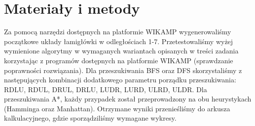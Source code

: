 \documentclass{classrep}
\begin{document}
\section{Materiały i metody}
Za pomocą narzędzi dostępnych na platformie WIKAMP wygenerowaliśmy początkowe układy łamigłówki w odległościach 1-7. Przetestowaliśmy wyżej wymienione algorytmy w wymaganych wariantach opisanych w treści zadania korzystając z programów dostępnych na platformie WIKAMP (sprawdzanie poprawności rozwiązania). Dla przeszukiwania BFS oraz DFS skorzystaliśmy z następujących kombinacji dodatkowego parametru porządku przeszukiwania: RDLU, RDUL, DRUL, DRLU, LUDR, LURD, ULRD, ULDR. Dla przeszukiwania A*, każdy przypadek został przeprowadzony na obu heurystykach (Hamminga oraz Manhattan). Otrzymane wyniki przenieśliśmy do arkusza kalkulacyjnego, gdzie sporządziliśmy wymagane wykresy. 
\end{document}
